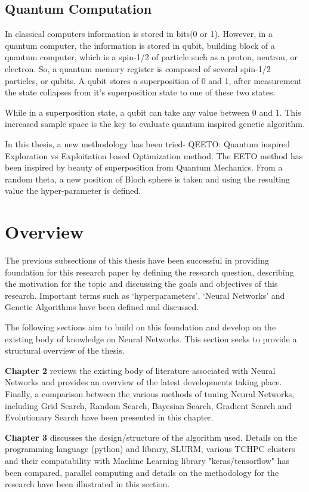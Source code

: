 \subsection{Quantum Computation}
In classical computers information is stored in bits(0 or 1). However, in a quantum computer, the information is stored in qubit, building block of a quantum computer, which is a spin-1/2 of particle such as a proton, neutron, or electron. So, a quantum memory register is composed of several spin-1/2 particles, or qubits. A qubit stores a superposition of 0 and 1, after measurement the state collapses from it's superposition state to one of these two states. 

While in a superposition state, a qubit can take any value between 0 and 1. This increased sample space is the key to evaluate quantum inspired genetic algorithm.


In this thesis, a new methodology has been tried- \newline QEETO: Quantum inspired Exploration vs Exploitation based Optimization method. The EETO method has been inspired by beauty of superposition from Quantum Mechanics.
From a random theta, a new position of Bloch sphere is taken and using the resulting value the hyper-parameter is defined.


\section{Overview}
The previous subsections of this thesis have been successful in providing foundation for this research paper by defining the research question, describing the motivation for the topic and discussing the goals and objectives of this research. Important terms such as ‘hyperparameters’, ‘Neural Networks’ and Genetic Algorithms have been defined and discussed. 

The following sections aim to build on this foundation and develop on the existing body of knowledge on Neural Networks. This section seeks to provide a structural overview of the thesis. 

\textbf{Chapter 2 }reviews the existing body of literature associated with Neural Networks and provides an overview of the latest developments taking place. Finally, a comparison between the various methods of tuning Neural Networks, including Grid Search, Random Search, Bayesian Search, Gradient Search and Evolutionary Search have been presented in this chapter. 

\textbf{Chapter 3 }discusses the design/structure of the algorithm used. Details on the programming language (python) and library, SLURM, various TCHPC clusters and their compatability with Machine Learning library "keras/tensorflow" has been compared, parallel computing and details on the methodology for the research have been illustrated in this section. 

